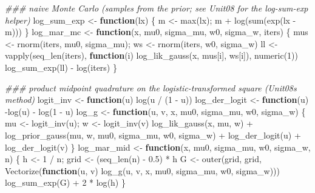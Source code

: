 \documentclass[
  letterpaper,
  DIV=11,
  numbers=noendperiod]{scrreprt}
\newenvironment{Shaded}{\begin{snugshade}}{\end{snugshade}}
\newcommand{\ControlFlowTok}[1]{\textcolor[rgb]{0.00,0.23,0.31}{\textbf{#1}}}
\newcommand{\DecValTok}[1]{\textcolor[rgb]{0.68,0.00,0.00}{#1}}
\newcommand{\DocumentationTok}[1]{\textcolor[rgb]{0.37,0.37,0.37}{\textit{#1}}}
\newcommand{\FloatTok}[1]{\textcolor[rgb]{0.68,0.00,0.00}{#1}}
\newcommand{\FunctionTok}[1]{\textcolor[rgb]{0.28,0.35,0.67}{#1}}
\newcommand{\NormalTok}[1]{\textcolor[rgb]{0.00,0.23,0.31}{#1}}
\newcommand{\OtherTok}[1]{\textcolor[rgb]{0.00,0.23,0.31}{#1}}
\newcommand{\SpecialCharTok}[1]{\textcolor[rgb]{0.37,0.37,0.37}{#1}}
\begin{document}
\begin{Shaded}
\begin{Highlighting}[]
\DocumentationTok{\#\#\# naive Monte Carlo (samples from the prior; see Unit08 for the log{-}sum{-}exp helper)}
\NormalTok{log\_sum\_exp }\OtherTok{\textless{}{-}} \ControlFlowTok{function}\NormalTok{(lx) \{ m }\OtherTok{\textless{}{-}} \FunctionTok{max}\NormalTok{(lx); m }\SpecialCharTok{+} \FunctionTok{log}\NormalTok{(}\FunctionTok{sum}\NormalTok{(}\FunctionTok{exp}\NormalTok{(lx }\SpecialCharTok{{-}}\NormalTok{ m))) \}}
\NormalTok{log\_mar\_mc }\OtherTok{\textless{}{-}} \ControlFlowTok{function}\NormalTok{(x, mu0, sigma\_mu, w0, sigma\_w, iters) \{}
\NormalTok{  mus }\OtherTok{\textless{}{-}} \FunctionTok{rnorm}\NormalTok{(iters, mu0, sigma\_mu); ws }\OtherTok{\textless{}{-}} \FunctionTok{rnorm}\NormalTok{(iters, w0, sigma\_w)}
\NormalTok{  ll }\OtherTok{\textless{}{-}} \FunctionTok{vapply}\NormalTok{(}\FunctionTok{seq\_len}\NormalTok{(iters), }\ControlFlowTok{function}\NormalTok{(i) }\FunctionTok{log\_lik\_gauss}\NormalTok{(x, mus[i], ws[i]), }\FunctionTok{numeric}\NormalTok{(}\DecValTok{1}\NormalTok{))}
  \FunctionTok{log\_sum\_exp}\NormalTok{(ll) }\SpecialCharTok{{-}} \FunctionTok{log}\NormalTok{(iters)}
\NormalTok{\}}

\DocumentationTok{\#\#\# product midpoint quadrature on the logistic{-}transformed square (Unit08\textquotesingle{}s method)}
\NormalTok{logit\_inv     }\OtherTok{\textless{}{-}} \ControlFlowTok{function}\NormalTok{(u) }\FunctionTok{log}\NormalTok{(u }\SpecialCharTok{/}\NormalTok{ (}\DecValTok{1} \SpecialCharTok{{-}}\NormalTok{ u))}
\NormalTok{log\_der\_logit }\OtherTok{\textless{}{-}} \ControlFlowTok{function}\NormalTok{(u) }\SpecialCharTok{{-}}\FunctionTok{log}\NormalTok{(u) }\SpecialCharTok{{-}} \FunctionTok{log}\NormalTok{(}\DecValTok{1} \SpecialCharTok{{-}}\NormalTok{ u)}
\NormalTok{log\_g }\OtherTok{\textless{}{-}} \ControlFlowTok{function}\NormalTok{(u, v, x, mu0, sigma\_mu, w0, sigma\_w) \{}
\NormalTok{  mu }\OtherTok{\textless{}{-}} \FunctionTok{logit\_inv}\NormalTok{(u); w }\OtherTok{\textless{}{-}} \FunctionTok{logit\_inv}\NormalTok{(v)}
  \FunctionTok{log\_lik\_gauss}\NormalTok{(x, mu, w) }\SpecialCharTok{+} \FunctionTok{log\_prior\_gauss}\NormalTok{(mu, w, mu0, sigma\_mu, w0, sigma\_w) }\SpecialCharTok{+}
    \FunctionTok{log\_der\_logit}\NormalTok{(u) }\SpecialCharTok{+} \FunctionTok{log\_der\_logit}\NormalTok{(v)}
\NormalTok{\}}
\NormalTok{log\_mar\_mid }\OtherTok{\textless{}{-}} \ControlFlowTok{function}\NormalTok{(x, mu0, sigma\_mu, w0, sigma\_w, n) \{}
\NormalTok{  h }\OtherTok{\textless{}{-}} \DecValTok{1} \SpecialCharTok{/}\NormalTok{ n; grid }\OtherTok{\textless{}{-}}\NormalTok{ (}\FunctionTok{seq\_len}\NormalTok{(n) }\SpecialCharTok{{-}} \FloatTok{0.5}\NormalTok{) }\SpecialCharTok{*}\NormalTok{ h}
\NormalTok{  G }\OtherTok{\textless{}{-}} \FunctionTok{outer}\NormalTok{(grid, grid, }\FunctionTok{Vectorize}\NormalTok{(}\ControlFlowTok{function}\NormalTok{(u, v) }\FunctionTok{log\_g}\NormalTok{(u, v, x, mu0, sigma\_mu, w0, sigma\_w)))}
  \FunctionTok{log\_sum\_exp}\NormalTok{(G) }\SpecialCharTok{+} \DecValTok{2} \SpecialCharTok{*} \FunctionTok{log}\NormalTok{(h)}
\NormalTok{\}}
\end{Highlighting}
\end{Shaded}
\end{document}
